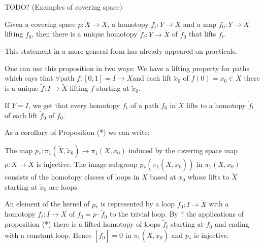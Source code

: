 \documentclass[12pt]{article}					%
\begin{document}

TODO? (Examples of covering space)

\begin{tvrzeni}
	Given a covering space $p: \tilde X \rightarrow X$, a homotopy $f_t: Y \rightarrow X$ and a map $\tilde f_0: Y \rightarrow \tilde X$ lifting $f_0$, then there is a unique homotopy $\tilde f_t: Y \rightarrow \tilde X$ of $\tilde f_0$ that lifts $f_t$.

	\begin{poznamka}
		This statement in a more general form has already appeared on practicals.
	\end{poznamka}

	\begin{poznamka}
		One can use this proposition in two ways: We have a lifting property for paths which says that $\forall$path $f: [0, 1] = I \rightarrow X$and each lift $\tilde x_0$ of $f(0) = x_0 \in X$ there is a unique $\tilde f: I \rightarrow \tilde X$ lifting $f$ starting at $\tilde x_0$.

		If $Y = I$, we get that every homotopy $f_t$ of a path $f_0$ in $X$ lifts to a homotopy $\tilde f_t$ of each lift $\tilde f_0$ of $f_0$.

		As a corollary of Proposition (*) we can write:
	\end{poznamka}
\end{tvrzeni}

\begin{dusledek}
	The map $p_*: π_1(\tilde X, \tilde x_0) \rightarrow π_1(X, x_0)$ induced by the covering space map $p: \tilde X \rightarrow X$ is injective. The image subgroup $p_*(π_1(\tilde X, \tilde x_0))$ in $π_1(X, x_0)$ consists of the homotopy classes of loops in $X$ based at $x_0$ whose lifts to $\tilde X$ starting at $\tilde x_0$ are loops.
	
	\begin{dukazin}[Of corollary]
		An element of the kernel of $p_*$ is represented by a loop $\tilde f_0: I \rightarrow \tilde X$ with a homotopy $f_t: I \rightarrow X$ of $f_0 = p·\tilde f_0$ to the trivial loop. By ? the applications of proposition (*) there is a lifted homotopy of loops $\tilde f_t$ starting at $f_0$ and ending with a constant loop. Hence $[\tilde f_0] = 0$ in $π_1(\tilde X, \tilde x_0)$ and $p_*$ is injective.
	\end{dukazin}
\end{dusledek}
\end{document}

